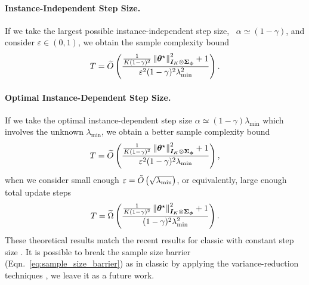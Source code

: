 \paragraph{Instance-Independent Step Size.}
If we take the largest possible instance-independent step size, \ie\ $\alpha\simeq (1-\gamma)$, and consider $\varepsilon\in(0, 1)$, we obtain the sample complexity bound
\begin{equation}\label{eq:largest_step_size_l2_sample_complexity}
    T=\widetilde{O}\left({\frac{\frac{1}{K(1-\gamma)^2}\left\|{{\bm{\theta}}^{\star}}\right\|^2_{{\bm{I}}_K\otimes{\bm{\Sigma}}_{{\bm{\phi}}}}+1}{\varepsilon^2(1-\gamma)^2\lambda_{\min}^2}}\right).
\end{equation}
\paragraph{Optimal Instance-Dependent Step Size.}
If we take the optimal instance-dependent step size $\alpha\simeq (1-\gamma)\lambda_{\min}$ which involves the unknown $\lambda_{\min}$, we obtain a better sample complexity bound
\begin{equation}\label{eq:instance_dependent_step_size_l2_sample_complexity}
    T=\widetilde{O}\left({ \frac{\frac{1}{K(1-\gamma)^2}\left\|{{\bm{\theta}}^{\star}}\right\|^2_{{\bm{I}}_K\otimes{\bm{\Sigma}}_{{\bm{\phi}}}}+1}{\varepsilon^2(1-\gamma)^2\lambda_{\min}}}\right),
\end{equation}
when we consider small enough $\varepsilon=\tilde{O}\left({\sqrt{\lambda_{\min}}}\right)$, or equivalently, large enough total update steps
\begin{equation}\label{eq:sample_size_barrier}
    T=\widetilde{\Omega}\left({\frac{\frac{1}{K(1-\gamma)^2}\left\|{{\bm{\theta}}^{\star}}\right\|^2_{{\bm{I}}_K\otimes{\bm{\Sigma}}_{{\bm{\phi}}}}+1}{(1-\gamma)^2\lambda_{\min}^2}}\right).
\end{equation}
These theoretical results match the recent results for classic {\LTD} with constant step size \citep{patil2023finite, li2024high, samsonov2024improved}. 
It is possible to break the sample size barrier (Eqn.~\eqref{eq:sample_size_barrier}) as in classic {\LTD} by applying the variance-reduction techniques \citep{li2023accelerated}
, we leave it as a future work.
